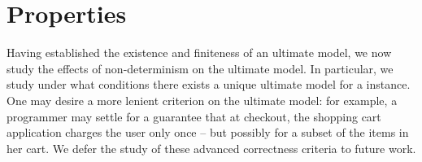 \section{Properties}
\label{sec:properties}



Having established the existence and finiteness of an ultimate model, we now
study the effects of non-determinism on the ultimate model.  In particular, we
study under what conditions there exists a unique ultimate model for a \lang
instance.  One may desire a more lenient criterion on the ultimate model: for
example, a programmer may settle for a guarantee that at checkout, the shopping
cart application charges the user only once -- but possibly for a subset of the
items in her cart.  We defer the study of these advanced correctness criteria to
future work.



